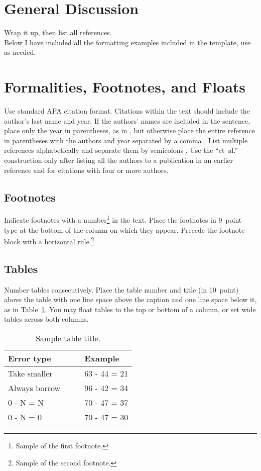 \documentclass[10pt,letterpaper]{article}
\begin{document}
\section{General Discussion}
Wrap it up, then list all references. \\
Below I have included all the formatting examples included in the template, use as needed.
\newpage
\section{Formalities, Footnotes, and Floats}

Use standard APA citation format. Citations within the text should
include the author's last name and year. If the authors' names are
included in the sentence, place only the year in parentheses, as in
, but otherwise place the entire reference in
parentheses with the authors and year separated by a comma
\cite{NewellSimon1972a}. List multiple references alphabetically and
separate them by semicolons
\cite{ChalnickBillman1988a,NewellSimon1972a}. Use the
``et~al.'' construction only after listing all the authors to a
publication in an earlier reference and for citations with four or
more authors.


\subsection{Footnotes}

Indicate footnotes with a number\footnote{Sample of the first
footnote.} in the text. Place the footnotes in 9~point type at the
bottom of the column on which they appear. Precede the footnote block
with a horizontal rule.\footnote{Sample of the second footnote.}


\subsection{Tables}

Number tables consecutively. Place the table number and title (in
10~point) above the table with one line space above the caption and
one line space below it, as in Table~\ref{sample-table}. You may float
tables to the top or bottom of a column, or set wide tables across
both columns.

\begin{table}[!ht]
\begin{center}
\caption{Sample table title.}
\label{sample-table}
\vskip 0.12in
\begin{tabular}{ll}
\hline
Error type & Example \\
\hline
Take smaller & 63 - 44 = 21 \\
Always borrow~~~~ & 96 - 42 = 34 \\
0 - N = N & 70 - 47 = 37 \\
0 - N = 0 & 70 - 47 = 30 \\
\hline
\end{tabular}
\end{center}
\end{table}
\end{document}
